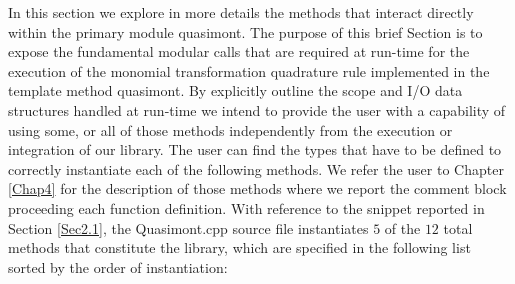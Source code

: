\documentclass[a4paper, twosided]{book}
\begin{document}
\noindent
In this section we explore in more details the methods that interact directly within the primary module \colorbox{poliGrayBlue}{quasimont}. The purpose of this brief Section is to expose the fundamental modular calls that are required at run-time for the execution of the monomial transformation quadrature rule implemented in the template method \colorbox{poliGrayBlue}{quasimont}. By explicitly outline the scope and I/O data structures handled at run-time we intend to provide the user with a capability of using some, or all of those methods independently from the execution or integration of our library. The user can find the types that have to be defined to correctly instantiate each of the following methods. We refer the user to Chapter \ref{Chap4} for the description of those methods where we report the comment block proceeding each function definition. With reference to the snippet reported in Section \ref{Sec2.1}, the \colorbox{poliGrayBlue}{Quasimont.cpp} source file instantiates $5$ of the $12$ total methods that constitute the library, which are specified in the following list sorted by the order of instantiation:
\end{document}
